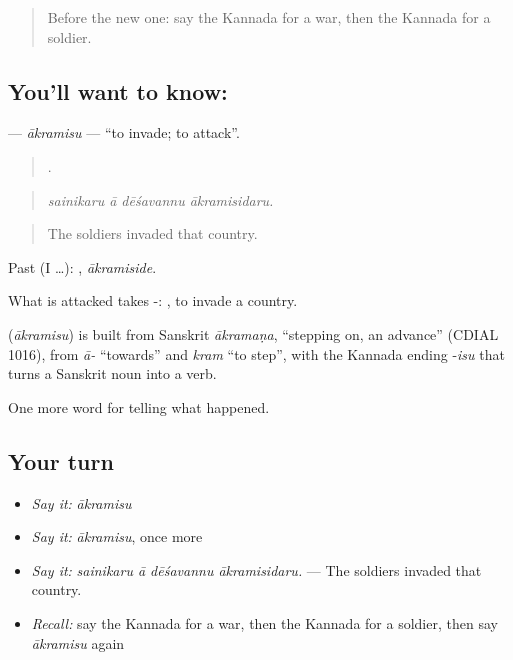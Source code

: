 \label{lesson:KA-C319-akramisu}



\begin{quote}
Before the new one: say the Kannada for a war, then the Kannada for a soldier.
\end{quote}

\subsection*{You'll want to know: }
\textbf{} — \emph{ākramisu} — \textquotedblleft{}to invade; to attack\textquotedblright{}.

\begin{quote}
   .
\end{quote}

\begin{quote}
\emph{sainikaru ā dēśavannu ākramisidaru.}
\end{quote}

\begin{quote}
The soldiers invaded that country.
\end{quote}

Past (I …): , \emph{ākramiside}.

What is attacked takes -:  , to invade a country.

\begin{cousinweb}
\textbf{} (\emph{ākramisu}) is built from Sanskrit \emph{ākramaṇa}, \textquotedblleft{}stepping on, an advance\textquotedblright{} (CDIAL 1016), from \emph{ā-} \textquotedblleft{}towards\textquotedblright{} and \emph{kram} \textquotedblleft{}to step\textquotedblright{}, with the Kannada ending -\emph{isu} that turns a Sanskrit noun into a verb.
\end{cousinweb}

\begin{grammarlens}[title={What you've built}]
One more word for telling what happened.
\end{grammarlens}

\subsection*{Your turn}
\begin{itemize}
\raggedright
  \item \emph{Say it:} \emph{ākramisu}
  \item \emph{Say it:} \emph{ākramisu}, once more
  \item \emph{Say it:} \emph{sainikaru ā dēśavannu ākramisidaru.} — The soldiers invaded that country.
  \item \emph{Recall:} say the Kannada for a war, then the Kannada for a soldier, then say \emph{ākramisu} again
\end{itemize}

